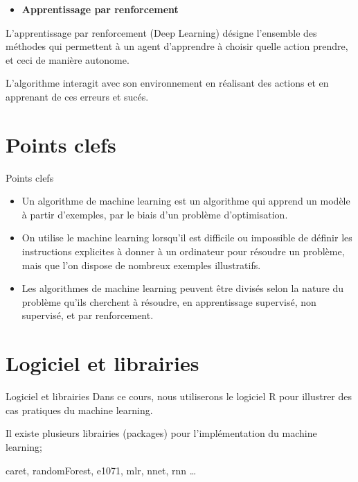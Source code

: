 \documentclass[
  10pt,
  ignorenonframetext,
]{beamer}
\providecommand{\tightlist}{%
  \setlength{\itemsep}{0pt}\setlength{\parskip}{0pt}}
\begin{document}
\begin{frame}
\begin{itemize}
\tightlist
\item
  \textbf{Apprentissage par renforcement}
\end{itemize}

L'apprentissage par renforcement (Deep Learning) désigne l'ensemble des
méthodes qui permettent à un agent d'apprendre à choisir quelle action
prendre, et ceci de manière autonome.

L'algorithme interagit avec son environnement en réalisant des actions
et en apprenant de ces erreurs et sucés.
\end{frame}

\hypertarget{points-clefs}{%
\section{Points clefs}\label{points-clefs}}

\begin{frame}{Points clefs}
\begin{itemize}
\item
  Un algorithme de machine learning est un algorithme qui apprend un
  modèle à partir d'exemples, par le biais d'un problème d'optimisation.
\item
  On utilise le machine learning lorsqu'il est difficile ou impossible
  de définir les instructions explicites à donner à un ordinateur pour
  résoudre un problème, mais que l'on dispose de nombreux exemples
  illustratifs.
\item
  Les algorithmes de machine learning peuvent être divisés selon la
  nature du problème qu'ils cherchent à résoudre, en apprentissage
  supervisé, non supervisé, et par renforcement.
\end{itemize}
\end{frame}

\hypertarget{logiciel-et-librairies}{%
\section{Logiciel et librairies}\label{logiciel-et-librairies}}

\begin{frame}{Logiciel et librairies}
Dans ce cours, nous utiliserons le logiciel R pour illustrer des cas
pratiques du machine learning.

Il existe plusieurs librairies (packages) pour l'implémentation du
machine learning;

caret, randomForest, e1071, mlr, nnet, rnn \ldots
\end{frame}
\end{document}
